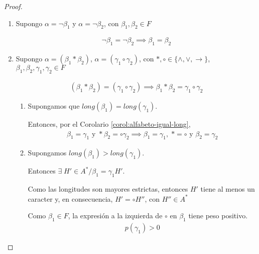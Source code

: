 \begin{proof} \phantom{.}

    \begin{enumerate}
        \item Supongo $\alpha = \neg \beta_1$ y $\alpha = \neg \beta_2$, con
            $\beta_1, \beta_2 \in F$

            \begin{gather*}
                \neg \beta_1 = \neg \beta_2 \implies \beta_1 = \beta_2
            \end{gather*}

        \item Supongo $\alpha = ( \beta_1 * \beta_2)$, 
            $\alpha = (\gamma_1 \circ \gamma_2)$, con 
            $*, \circ \in \{ \wedge,\vee,\to \}$, $\beta_1, \beta_2, 
            \gamma_1, \gamma_2 \in F$

            \begin{gather*}
                (\beta_1*\beta_2) = (\gamma_1 \circ \gamma_2)
                \implies \beta_1 * \beta_2 = \gamma_1 \circ \gamma_2
            \end{gather*}

            \begin{enumerate}
                \item Supongamos que $long(\beta_1) = long(\gamma_1)$.

                    Entonces, por el Corolario \ref{corol:alfabeto-igual-long},
                    \begin{gather*}
                        \beta_1 = \gamma_1 \text{ y } 
                        *\beta_2 = \circ \gamma_2
                        \implies \beta_1 = \gamma_1, \; * = \circ \text{ y }
                        \beta_2 = \gamma_2
                    \end{gather*}
                    
                \item Supongamos $long(\beta_1) > long(\gamma_1)$.

                    Entonces $\exists \; H'\in A^{*} / \beta_1 = \gamma_1 H'$.

                    Como las longitudes son mayores estrictas, entonces $H'$
                    tiene al menos un caracter y, en consecuencia, 
                    $H'=\circ H''$, con $H'' \in A^{*}$

                    Como $\beta_1 \in F$, la expresión a la izquierda de 
                    $\circ$ en $\beta_1$ tiene peso positivo.
                    \begin{gather*}
                        p(\gamma_1) > 0
                    \end{gather*}


\end{enumerate}
\end{enumerate}
\end{proof}
